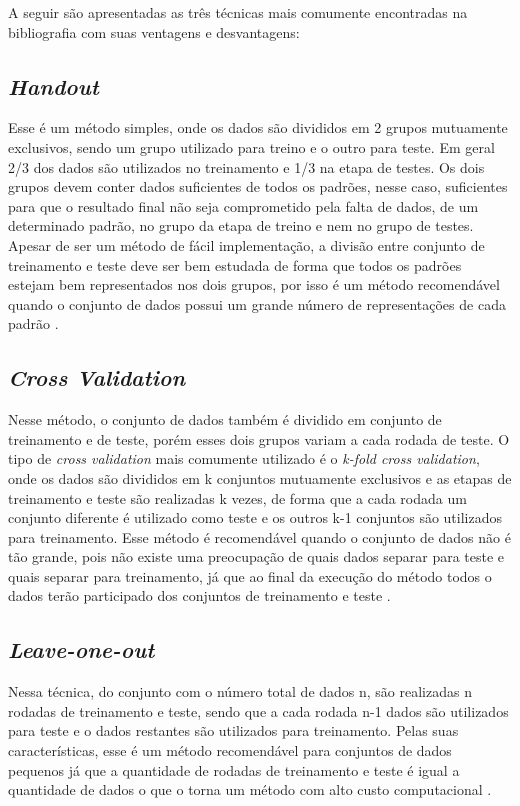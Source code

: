 A seguir são apresentadas as três técnicas mais comumente encontradas na bibliografia com suas ventagens e desvantagens:

\subsection{\textit{Handout}}
Esse é um método simples, onde os dados são divididos em 2 grupos mutuamente exclusivos, sendo um grupo utilizado para treino e o outro para teste. Em geral 2/3 dos dados são utilizados no treinamento e 1/3 na etapa de testes. Os dois grupos devem conter dados suficientes de todos os padrões, nesse caso, suficientes para que o resultado final não seja comprometido pela falta de dados, de um determinado padrão, no grupo da etapa de treino e nem no grupo de testes. Apesar de ser um método de fácil implementação, a divisão entre conjunto de treinamento e teste deve ser bem estudada de forma que todos os padrões estejam bem representados nos dois grupos, por isso é um método recomendável quando o conjunto de dados possui um grande número de representações de cada padrão \cite{Kohavi95Cross} \cite{Baldisserotto05Validacao}.

\subsection {\textit{Cross Validation}}
Nesse método, o conjunto de dados também é dividido em conjunto de treinamento e de teste, porém esses dois grupos variam a cada rodada de teste. O tipo de \textit{cross validation} mais comumente utilizado é o \textit{k-fold cross validation}, onde os dados são divididos em k conjuntos mutuamente exclusivos e as etapas de treinamento e teste são realizadas k vezes, de forma que a cada rodada um conjunto diferente é utilizado como teste e os outros k-1 conjuntos são utilizados para treinamento. Esse método é recomendável quando o conjunto de dados não é tão grande, pois não existe uma  preocupação de quais dados separar para teste e quais separar para treinamento, já que ao final da execução do método todos o dados terão participado dos conjuntos de treinamento e teste \cite{Kohavi95Cross} \cite{Baldisserotto05Validacao}.

\subsection{\textit{Leave-one-out}}
Nessa técnica, do conjunto com o número total de dados n, são realizadas n rodadas de treinamento e teste, sendo que a cada rodada n-1 dados são utilizados para teste e o dados restantes são utilizados para treinamento. Pelas suas características, esse é um método recomendável para conjuntos de dados pequenos já que a quantidade de rodadas de treinamento e teste é igual a quantidade de dados o que o torna um método com alto custo computacional \cite{Kohavi95Cross} \cite{Baldisserotto05Validacao}.
